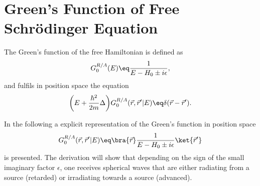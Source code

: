 \documentclass[\main/dresen_thesis.tex]{subfiles}
\begin{document}
\section{Green's Function of Free Schr\"odinger Equation}\label{ch:appendix:calculations:greenFunctionFreeHamiltonian}
The Green's function of the free Hamiltonian is defined as
\begin{align}
  G_0^{R/A} (E) \eq \frac{1}{E - H_0 \pm i \epsilon},
\end{align}
and fulfils in position space the equation
\begin{align}
  \bigg(E + \frac{\hbar^2}{2m} \Delta \bigg)G_0^{R/A}(\vec{r}, \vec{r}^\prime | E)
  \eq \delta(\vec{r} - \vec{r}^\prime).
  \label{eq:appendix:calculations:greenFunctionFreeHamiltonian:definingEquation}
\end{align}

In the following a explicit representation of the Green's function in position space
\begin{align}
  G_0^{R/A}(\vec{r}, \vec{r}^\prime | E) \eq \bra{\vec{r}} \frac{1}{E - H_0 \pm i \epsilon} \ket{\vec{r}^\prime}
\end{align}
is presented.
The derivation will show that depending on the sign of the small imaginary factor $\epsilon$, one receives spherical waves that are either radiating from a source (retarded) or irradiating towards a source (advanced).
\end{document}
